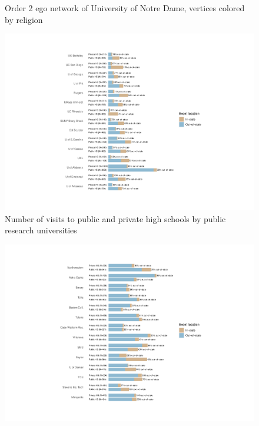 \documentclass[
  12pt,
]{article}
\begin{document}
\begin{landscape}
\begin{figure}
{}

\caption{Order 2 ego network of University of Notre Dame, vertices colored by religion}\label{fig:nd-religion}
\end{figure}

\newpage

\begin{figure}

{\centering \includegraphics[width=2\linewidth]{../assets/figures/events_hs_count_pubu} 

}

\caption{Number of visits to public and private high schools by public research universities}\label{fig:events-hs-count-pubu}
\end{figure}

\newpage

\begin{figure}

{\centering \includegraphics[width=2\linewidth]{../assets/figures/events_hs_count_privu} 

}
\end{figure}
\end{landscape}
\end{document}
